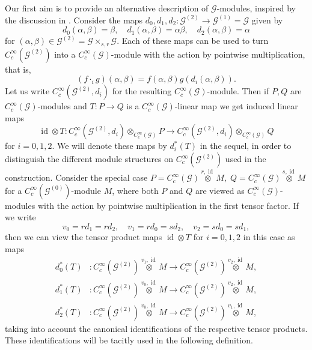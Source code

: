 \documentclass{amsart}
\newcommand{\G}{\mathcal{G}}
\newcommand{\ccinfty}{C_c^\infty}
\DeclareMathOperator{\id}{id}
\begin{document}
Our first aim is to provide an alternative description of $ \G $-modules, inspired by the discussion in \cite{BUSS_HOLKAR_MEYER_universalproperty}. 
Consider the maps $ d_0,d_1,d_2: \G^{(2)} \rightarrow \G^{(1)} = \G $ given by 
\begin{equation*} \label{equation: v_0,v_1,v_2}
d_0(\alpha,\beta) = \beta, \quad d_1(\alpha,\beta) = \alpha\beta,\quad d_2(\alpha,\beta) = \alpha
\end{equation*}
for $ (\alpha,\beta) \in \G^{(2)} = \G \times_{s,r} \G $. 
Each of these maps can be used to turn $ \ccinfty(\G^{(2)}) $ into a $ \ccinfty(\G) $-module with the action by pointwise multiplication, that is,  
$$
(f \cdot_i g)(\alpha, \beta) = f(\alpha, \beta) g(d_i(\alpha, \beta)).  
$$
Let us write $ \ccinfty(\G^{(2)}, d_i) $ for the resulting $ \ccinfty(\G) $-module. 
Then if $ P, Q $ are $ \ccinfty(\G) $-modules and $ T: P \rightarrow Q $ is a $ \ccinfty(\G) $-linear map we get induced linear maps  
$$
\id \otimes T: \ccinfty(\G^{(2)}, d_i) \otimes_{\ccinfty(\G)} P \rightarrow \ccinfty(\G^{(2)}, d_i) \otimes_{\ccinfty(\G)} Q
$$
for $ i = 0,1,2 $. We will denote these maps by $ d_i^*(T) $ in the sequel, in order to distinguish the different module structures on $ \ccinfty(\G^{(2)}) $ used in the construction. 
Consider the special case $ P = \ccinfty(\G)\stackrel{r,\id}{\otimes} M,\; Q =  \ccinfty(\G)\stackrel{s,\id}{\otimes} M $ for a $ \ccinfty(\G^{(0)}) $-module $ M $, where both $ P $ and $ Q $ are viewed as $ \ccinfty(\G) $-modules with the action by pointwise multiplication in the first tensor factor. If we write 
\begin{equation*} 
v_0 = r d_1 = r d_2, \quad v_1 = r d_0 = s d_2, \quad v_2 = s d_0 = s d_1,   
\end{equation*}
then we can view the tensor product maps $ \id \otimes T $ for $ i = 0,1,2 $ in this case as maps
\begin{align*}
d_0^*(T)&:\ccinfty(\G^{(2)})\stackrel{v_1,\id}{\otimes} M \rightarrow \ccinfty(\G^{(2)})\stackrel{v_2,\id}{\otimes} M,\\
d_1^*(T)&:\ccinfty(\G^{(2)})\stackrel{v_0,\id}{\otimes} M \rightarrow \ccinfty(\G^{(2)})\stackrel{v_2,\id}{\otimes} M,\\
d_2^*(T)&:\ccinfty(\G^{(2)})\stackrel{v_0,\id}{\otimes} M \rightarrow \ccinfty(\G^{(2)})\stackrel{v_1,\id}{\otimes} M,
\end{align*}
taking into account the canonical identifications of the respective tensor products. These identifications will be tacitly used in the following definition. 
\end{document}

